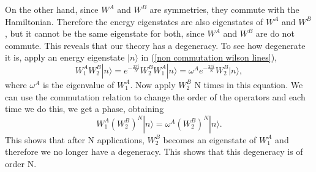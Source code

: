 \documentclass{article}
\begin{document}
On the other hand, since $W^A$ and $W^B$ are symmetries, they commute with the Hamiltonian. Therefore the energy eigenstates are also eigenstates of $W^A$ and $W^B$, but it cannot be the same eigenstate for both, since $W^A$ and $W^B$ are do not commute. This reveals that our theory has a degeneracy. To see how degenerate it is, apply an energy eigenstate $|n\rangle$ in (\ref{non commutation wilson lines}), 
\begin{equation}\label{non commutation wilson lines}
	W_1^AW_2^B|n\rangle=e^{-\frac{2\pi i}{N}}W_2^BW_1^A|n\rangle=\omega^Ae^{-\frac{2\pi i}{N}}W_2^B|n\rangle, 
\end{equation}
where $\omega^A$ is the eigenvalue of $W_1^A$. Now apply $W_2^B$ N times in this equation. We can use the commutation relation to change the order of the operators and each time we do this, we get a phase, obtaining 
\begin{equation}
	W_1^A(W_2^B)^N|n\rangle=\omega^A(W_2^B)^N|n\rangle.
\end{equation}
This shows that after N applications, $W_2^B$ becomes an eigenstate of $W_1^A$ and therefore we no longer have a degeneracy. This shows that this degeneracy is of order N.
\nocite{*}


\end{document}
